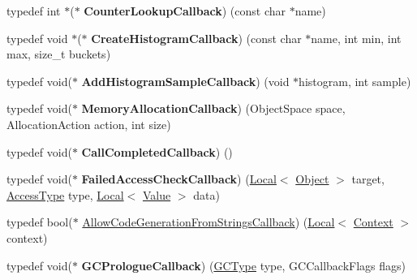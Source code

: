 \begin{DoxyCompactItemize}
\item 
\hypertarget{namespacev8_a5efca05a9f1f278a4eec832ce419104f}{}typedef int $\ast$($\ast$ {\bfseries Counter\+Lookup\+Callback}) (const char $\ast$name)\label{namespacev8_a5efca05a9f1f278a4eec832ce419104f}

\item 
\hypertarget{namespacev8_aafbf15734701792a14c02dbca7535b75}{}typedef void $\ast$($\ast$ {\bfseries Create\+Histogram\+Callback}) (const char $\ast$name, int min, int max, size\+\_\+t buckets)\label{namespacev8_aafbf15734701792a14c02dbca7535b75}

\item 
\hypertarget{namespacev8_a5a7c6bb8050ad84f0a453056ec325d1c}{}typedef void($\ast$ {\bfseries Add\+Histogram\+Sample\+Callback}) (void $\ast$histogram, int sample)\label{namespacev8_a5a7c6bb8050ad84f0a453056ec325d1c}

\item 
\hypertarget{namespacev8_a2402a6535cafc5f721192b300502fb0a}{}typedef void($\ast$ {\bfseries Memory\+Allocation\+Callback}) (Object\+Space space, Allocation\+Action action, int size)\label{namespacev8_a2402a6535cafc5f721192b300502fb0a}

\item 
\hypertarget{namespacev8_a8d88696ff21bd777d488605cb7714573}{}typedef void($\ast$ {\bfseries Call\+Completed\+Callback}) ()\label{namespacev8_a8d88696ff21bd777d488605cb7714573}

\item 
\hypertarget{namespacev8_a1352a0d6e487b7092ea79e2d3d4ecd12}{}typedef void($\ast$ {\bfseries Failed\+Access\+Check\+Callback}) (\hyperlink{classv8_1_1_local}{Local}$<$ \hyperlink{classv8_1_1_object}{Object} $>$ target, \hyperlink{namespacev8_add8bef6469c5b94706584124e610046c}{Access\+Type} type, \hyperlink{classv8_1_1_local}{Local}$<$ \hyperlink{classv8_1_1_value}{Value} $>$ data)\label{namespacev8_a1352a0d6e487b7092ea79e2d3d4ecd12}

\item 
typedef bool($\ast$ \hyperlink{namespacev8_a521d909ec201742a1cb35d50a8e2a3c2}{Allow\+Code\+Generation\+From\+Strings\+Callback}) (\hyperlink{classv8_1_1_local}{Local}$<$ \hyperlink{classv8_1_1_context}{Context} $>$ context)
\item 
\hypertarget{namespacev8_a09e509ff7a94ad074420980c5f5762af}{}typedef void($\ast$ {\bfseries G\+C\+Prologue\+Callback}) (\hyperlink{namespacev8_ac109d6f27e0c0f9ef4e98bcf7a806cf2}{G\+C\+Type} type, G\+C\+Callback\+Flags flags)\label{namespacev8_a09e509ff7a94ad074420980c5f5762af}


\end{DoxyCompactItemize}
